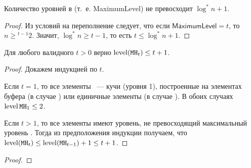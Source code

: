 \begin{lem} \label{th:log*-levels}
Количество уровней в \CH[*] (т.~е. \textsf{MaximumLevel}) не превосходит
$\log^* n + 1$.
\end{lem}
\begin{proof}
Из условий на переполнение следует, что если $\mathsf{MaximumLevel} = t$,
то $n \geq {}^{t-1}2$. Значит, $\log^* n \geq t-1$, то есть
$t \leq \log^* n + 1$.
\end{proof}


\begin{lem} \label{th:small-mh-level}
Для любого валидного $t > 0$ верно
$\lev(\MH[t]) \leq t + 1$.
\end{lem}
\begin{proof}
Докажем индукцией по $t$.

Если $t=1$, то все элементы \MH[t]~--- кучи (уровня 1), построенные на элементах буфера
(в случае \CH[r]) или единичные элементы (в случае \CH[*]). В обоих случаях $\lev \MH[1] \leq 2$.

Если $t > 1$, то все элементы \MH[t] имеют уровень, не превосходящий максимальный уровень
\MH[t-1]. Тогда из предположения индукции получаем, что $\lev(\MH[t]) \leq \lev(\MH[t-1]) + 1 \leq t+1$.
\end{proof}


\begin{lem} \label{th:small-hh-level}

\end{lem}
\begin{proof}
\end{proof}


